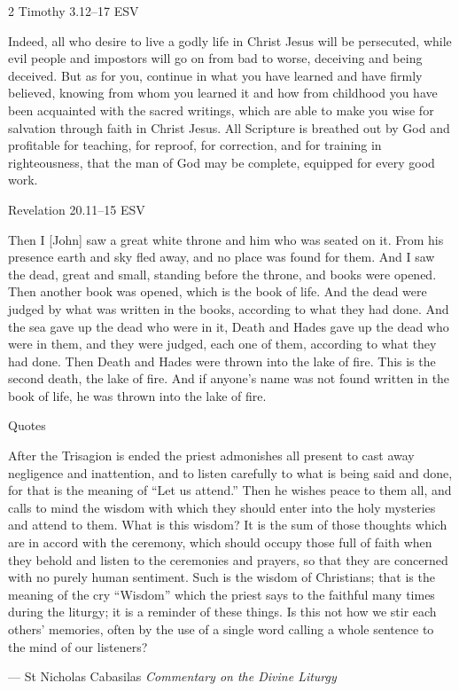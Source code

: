 \documentclass[
]{article}
\newcommand{\RL}[1]{\beginR #1\endR}
\begin{document}
2 Timothy 3.12--17 ESV

Indeed, all who desire to live a godly life in Christ Jesus will be
persecuted, while evil people and impostors will go on from bad to
worse, deceiving and being deceived. But as for you, continue in what
you have learned and have firmly believed, knowing from whom you learned
it and how from childhood you have been acquainted with the sacred
writings, which are able to make you wise for salvation through faith in
Christ Jesus. All Scripture is breathed out by God and profitable for
teaching, for reproof, for correction, and for training in
righteousness, that the man of God may be complete, equipped for every
good work.

Revelation 20.11--15 ESV

Then I {[}John{]} saw a great white throne and him who was seated on it.
From his presence earth and sky fled away, and no place was found for
them. And I saw the dead, great and small, standing before the throne,
and books were opened. Then another book was opened, which is the book
of life. And the dead were judged by what was written in the books,
according to what they had done. And the sea gave up the dead who were
in it, Death and Hades gave up the dead who were in them, and they were
judged, each one of them, according to what they had done. Then Death
and Hades were thrown into the lake of fire. This is the second death,
the lake of fire. And if anyone\RL{'}s name was not found written in the
book of life, he was thrown into the lake of fire.

Quotes

After the Trisagion is ended the priest admonishes all present to cast
away negligence and inattention, and to listen carefully to what is
being said and done, for that is the meaning of ``Let us attend.'' Then
he wishes peace to them all, and calls to mind the wisdom with which
they should enter into the holy mysteries and attend to them. What is
this wisdom? It is the sum of those thoughts which are in accord with
the ceremony, which should occupy those full of faith when they behold
and listen to the ceremonies and prayers, so that they are concerned
with no purely human sentiment. Such is the wisdom of Christians; that
is the meaning of the cry ``Wisdom'' which the priest says to the
faithful many times during the liturgy; it is a reminder of these
things. Is this not how we stir each others' memories, often by the use
of a single word calling a whole sentence to the mind of our listeners?

--- St Nicholas Cabasilas \emph{Commentary on the Divine Liturgy}
\end{document}
